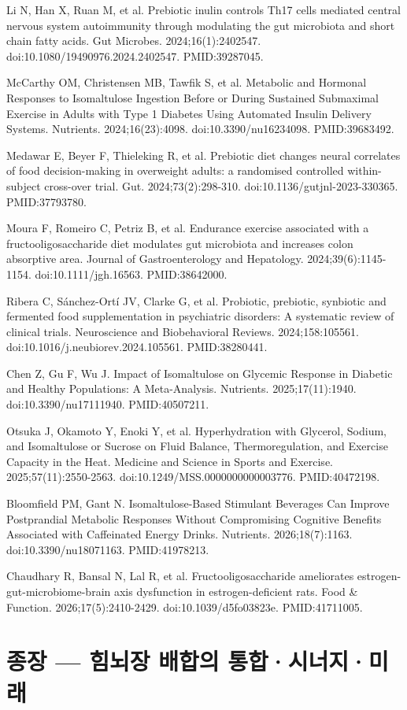 \documentclass[11pt,oneside]{book}
\newcommand{\refend}{\endgroup\par}
\newcommand{\reff}[2]{\par\hangindent=7mm\hangafter=1\noindent[#1]\hspace{2mm}#2\par}
\begin{document}
\reff{30}{Li N, Han X, Ruan M, et al. Prebiotic inulin controls Th17 cells mediated central nervous system autoimmunity through modulating the gut microbiota and short chain fatty acids. Gut Microbes. 2024;16(1):2402547. doi:10.1080/19490976.2024.2402547. PMID:39287045.}
\reff{31}{McCarthy OM, Christensen MB, Tawfik S, et al. Metabolic and Hormonal Responses to Isomaltulose Ingestion Before or During Sustained Submaximal Exercise in Adults with Type 1 Diabetes Using Automated Insulin Delivery Systems. Nutrients. 2024;16(23):4098. doi:10.3390/nu16234098. PMID:39683492.}
\reff{32}{Medawar E, Beyer F, Thieleking R, et al. Prebiotic diet changes neural correlates of food decision-making in overweight adults: a randomised controlled within-subject cross-over trial. Gut. 2024;73(2):298-310. doi:10.1136/gutjnl-2023-330365. PMID:37793780.}
\reff{33}{Moura F, Romeiro C, Petriz B, et al. Endurance exercise associated with a fructooligosaccharide diet modulates gut microbiota and increases colon absorptive area. Journal of Gastroenterology and Hepatology. 2024;39(6):1145-1154. doi:10.1111/jgh.16563. PMID:38642000.}
\reff{34}{Ribera C, Sánchez-Ortí JV, Clarke G, et al. Probiotic, prebiotic, synbiotic and fermented food supplementation in psychiatric disorders: A systematic review of clinical trials. Neuroscience and Biobehavioral Reviews. 2024;158:105561. doi:10.1016/j.neubiorev.2024.105561. PMID:38280441.}
\reff{35}{Chen Z, Gu F, Wu J. Impact of Isomaltulose on Glycemic Response in Diabetic and Healthy Populations: A Meta-Analysis. Nutrients. 2025;17(11):1940. doi:10.3390/nu17111940. PMID:40507211.}
\reff{36}{Otsuka J, Okamoto Y, Enoki Y, et al. Hyperhydration with Glycerol, Sodium, and Isomaltulose or Sucrose on Fluid Balance, Thermoregulation, and Exercise Capacity in the Heat. Medicine and Science in Sports and Exercise. 2025;57(11):2550-2563. doi:10.1249/MSS.0000000000003776. PMID:40472198.}
\reff{37}{Bloomfield PM, Gant N. Isomaltulose-Based Stimulant Beverages Can Improve Postprandial Metabolic Responses Without Compromising Cognitive Benefits Associated with Caffeinated Energy Drinks. Nutrients. 2026;18(7):1163. doi:10.3390/nu18071163. PMID:41978213.}
\reff{38}{Chaudhary R, Bansal N, Lal R, et al. Fructooligosaccharide ameliorates estrogen-gut-microbiome-brain axis dysfunction in estrogen-deficient rats. Food \& Function. 2026;17(5):2410-2429. doi:10.1039/d5fo03823e. PMID:41711005.}
\refend


\chapter{종장 — 힘뇌장 배합의 통합·시너지·미래}
\end{document}
